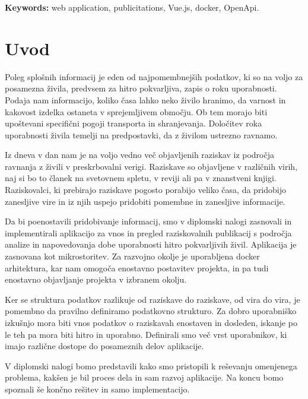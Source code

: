\documentclass[a4paper, 12pt]{book}
\newcommand{\tkeywordsEn}{web application, publicitations, Vue.js, docker, OpenApi}
\newcommand{\clearemptydoublepage}{\newpage{\pagestyle{empty}\cleardoublepage}}
\begin{document}
\noindent\textbf{Keywords:} \tkeywordsEn.
\clearemptydoublepage

\mainmatter
\setcounter{page}{1}
\pagestyle{fancy}


\chapter{Uvod}

Poleg splošnih informacij je eden od najpomembnejših podatkov, ki so na voljo za posamezna živila, predvsem za hitro pokvarljiva, zapis o roku uporabnosti. Podaja nam informacijo, koliko časa lahko neko živilo hranimo, da varnost in kakovost izdelka ostaneta v sprejemljivem območju. Ob tem morajo biti upoštevani specifični pogoji transporta in shranjevanja. Določitev roka uporabnosti živila temelji na predpostavki, da z živilom ustrezno ravnamo.

Iz dneva v dan nam je na voljo vedno več objavljenih raziskav iz področja ravnanja z živili v preskrbovalni verigi. Raziskave so objavljene v različnih virih, naj si bo to članek na svetovnem spletu, v reviji ali pa v znanstveni knjigi. Raziskovalci, ki prebirajo raziskave pogosto porabijo veliko časa, da pridobijo zanesljive vire in iz njih uspejo pridobiti pomembne in zanesljive informacije.

Da bi poenostavili pridobivanje informacij, smo v diplomski nalogi zasnovali in implementirali aplikacijo za vnos in pregled raziskovalnih publikacij s področja analize in napovedovanja dobe uporabnosti hitro pokvarljivih živil. Aplikacija je zasnovana kot mikrostoritev. Za razvojno okolje je uporabljena docker arhitektura, kar nam omogoča enostavno postavitev projekta, in pa tudi enostavno objavljanje projekta v izbranem okolju. 

Ker se struktura podatkov razlikuje od raziskave do raziskave, od vira do vira, je pomembno da pravilno definiramo podatkovno strukturo. Za dobro uporabniško izkušnjo mora biti vnos podatkov o raziskavah enostaven in dosleden, iskanje po le teh pa mora biti hitro in uporabno. Definirali smo več vrst uporabnikov, ki imajo različne dostope do posameznih delov aplikacije.

V diplomski nalogi bomo predstavili kako smo pristopili k reševanju omenjenega problema, kakšen je bil proces dela in sam razvoj aplikacije. Na koncu bomo spoznali še končno rešitev in samo implementacijo.


\end{document}
